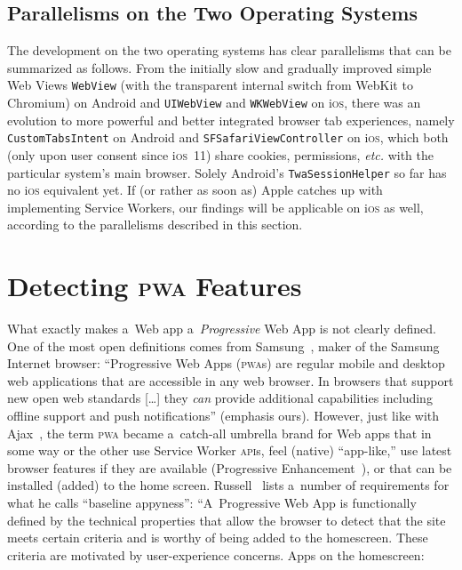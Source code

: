 \documentclass[sigconf]{acmart}
\begin{document}
\subsection{Parallelisms on the Two Operating Systems}

The development on the two operating systems has clear parallelisms
that can be summarized as follows.
From the initially slow and gradually improved simple Web Views \texttt{WebView}
(with the transparent internal switch from WebKit to Chromium)
on Android and \texttt{UIWebView} and \texttt{WKWebView} on i\textsc{os},
there was an evolution to more powerful and better integrated browser tab experiences,
namely \texttt{CustomTabsIntent} on Android and
\texttt{SFSafariViewController} on i\textsc{os},
which both (only upon user consent since i\textsc{os}~11)
share cookies, permissions, \emph{etc.}
with the particular system's main browser.
Solely Android's \texttt{TwaSessionHelper} so far has no i\textsc{os} equivalent yet.
If (or rather as soon as) Apple catches up with implementing Service Workers,
our findings will be applicable on i\textsc{os} as well,
according to the parallelisms described in this section.

\section{Detecting \textsc{pwa} Features}
\label{sec:pwa-feature-detector}

What exactly makes a~Web app a~\emph{Progressive} Web App is not clearly defined.
One of the most open definitions comes from Samsung~\cite{samsung2017pwa},
maker of the Samsung Internet browser:
``Progressive Web Apps (\textsc{pwa}s) are regular mobile and desktop web applications
that are accessible in any web browser.
In browsers that support new open web standards [\ldots]
they \emph{can} provide additional capabilities
including offline support and push notifications'' (emphasis ours).
However, just like with Ajax~\cite{garret2005ajax}, the term \textsc{pwa}
became a~catch-all umbrella brand for Web apps
that in some way or the other use Service Worker \textsc{api}s,
feel (native) ``app-like,'' use latest browser features if they are available
(Progressive Enhancement~\cite{champeon2003progressiveenhancement}),
or that can be installed (added) to the home screen.
Russell~\cite{russell2016pwa} lists a~number of requirements 
for what he calls ``baseline appyness'':
``A~Progressive Web App is functionally defined by the technical properties
that allow the browser to detect that the site meets certain criteria
and is worthy of being added to the homescreen.
These criteria are motivated by user-experience concerns.
Apps on the homescreen:
\end{document}
